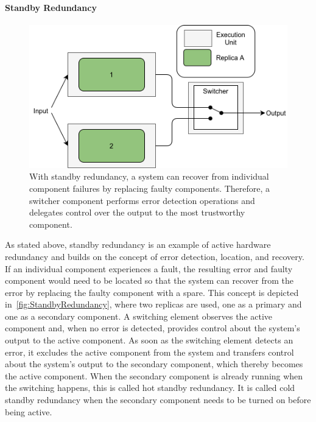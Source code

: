 \paragraph{Standby Redundancy}
\begin{figure}[!hb]
	\centering
	\includegraphics[width=0.8\linewidth]{images/ActiveSelectionRedundancy}
	\caption{With standby redundancy, a system can recover from individual component failures by replacing faulty components. Therefore, a switcher component performs error detection operations and delegates control over the output to the most trustworthy component.}
	\label{fig:StandbyRedundancy}
\end{figure}

As stated above, standby redundancy is an example of active hardware redundancy and builds on the concept of error detection, location, and recovery.
If an individual component experiences a fault, the resulting error and faulty component would need to be located so that the system can recover from the error by replacing the faulty component with a spare.
This concept is depicted in~\autoref{fig:StandbyRedundancy}, where two replicas are used, one as a primary and one as a secondary component.
A switching element observes the active component and, when no error is detected, provides control about the system's output to the active component.
As soon as the switching element detects an error, it excludes the active component from the system and transfers control about the system's output to the secondary component, which thereby becomes the active component.
When the secondary component is already running when the switching happens, this is called hot standby redundancy.
It is called cold standby redundancy when the secondary component needs to be turned on before being active.

